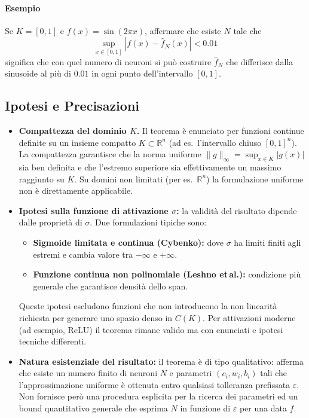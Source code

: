 \documentclass[a4paper,12pt]{report}
\begin{document}
	\paragraph{Esempio} Se \(K=[0,1]\) e \(f(x)=\sin(2\pi x)\), affermare che esiste \(N\) tale che
	\[
	\sup_{x\in[0,1]}|f(x)-\hat f_N(x)|<0.01
	\]
	significa che con quel numero di neuroni si può costruire \(\hat f_N\) che differisce dalla sinusoide al più di \(0.01\) in ogni punto dell'intervallo \([0,1]\).
	
	\subsection{Ipotesi e Precisazioni}
	\begin{itemize}
		\item \textbf{Compattezza del dominio \(K\).} Il teorema è enunciato per funzioni continue definite su un insieme compatto \(K\subset\mathbb{R}^n\) (ad es.\ l'intervallo chiuso \([0,1]^n\)). La compattezza garantisce che la norma uniforme \(\|g\|_\infty=\sup_{x\in K}|g(x)|\) sia ben definita e che l'estremo superiore sia effettivamente un massimo raggiunto su \(K\). Su domini non limitati (per es.\ \(\mathbb{R}^n\)) la formulazione uniforme non è direttamente applicabile.
		
		\item \textbf{Ipotesi sulla funzione di attivazione \(\sigma\):} la validità del risultato dipende dalle proprietà di \(\sigma\). Due formulazioni tipiche sono:
		\begin{itemize}
			\item \textbf{Sigmoide limitata e continua (Cybenko):} dove \(\sigma\) ha limiti finiti agli estremi e cambia valore tra \(-\infty\) e \(+\infty\).
			\item \textbf{Funzione continua non polinomiale (Leshno et\,al.):} condizione più generale che garantisce densità dello span.
		\end{itemize}
		Queste ipotesi escludono funzioni che non introducono la non linearità richiesta per generare uno spazio denso in \(C(K)\). Per attivazioni moderne (ad esempio, ReLU) il teorema rimane valido ma con enunciati e ipotesi tecniche differenti.
		
		\item \textbf{Natura esistenziale del risultato:} il teorema è di tipo qualitativo: afferma che esiste un numero finito di neuroni \(N\) e parametri \((c_i,w_i,b_i)\) tali che l'approssimazione uniforme è ottenuta entro qualsiasi tolleranza prefissata \(\varepsilon\). Non fornisce però una procedura esplicita per la ricerca dei parametri ed un bound quantitativo generale che esprima \(N\) in funzione di \(\varepsilon\) per una data \(f\).
		

\end{itemize}
\end{document}
